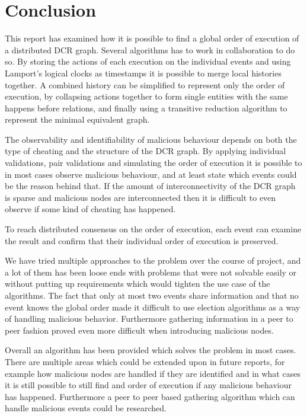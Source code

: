 \chapter{Conclusion}
This report has examined how it is possible to find a global order of execution of a distributed DCR graph. Several algorithms has to work in collaboration to do so. By storing the actions of each execution on the individual events and using Lamport's logical clocks as timestamps it is possible to merge local histories together. A combined history can be simplified to represent only the order of execution, by collapsing actions together to form single entities with the same happens before relations, and finally using a transitive reduction algorithm to represent the minimal equivalent graph.

The observability and identifiability of malicious behaviour depends on both the type of cheating and the structure of the DCR graph. By applying individual validations, pair validations and simulating the order of execution it is possible to in most cases observe malicious behaviour, and at least state which events could be the reason behind that. If the amount of interconnectivity of the DCR graph is sparse and malicious nodes are interconnected then it is difficult to even observe if some kind of cheating has happened.

To reach distributed consensus on the order of execution, each event can examine the result and confirm that their individual order of execution is preserved.


\newpar We have tried multiple approaches to the problem over the course of project, and a lot of them has been loose ends with problems that were not solvable easily or without putting up requirements which would tighten the use case of the algorithms. The fact that only at most two events share information and that no event knows the global order made it difficult to use election algorithms as a way of handling malicious behavior. Furthermore gathering information in a peer to peer fashion proved even more difficult when introducing malicious nodes.

\newpar Overall an algorithm has been provided which solves the problem in most cases. There are multiple areas which could be extended upon in future reports, for example how malicious nodes are handled if they are identified and in what cases it is still possible to still find and order of execution if any malicious behaviour has happened. Furthermore a peer to peer based gathering algorithm which can handle malicious events could be researched.